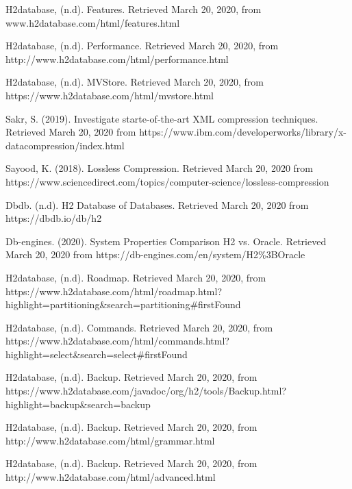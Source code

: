 \documentclass{acmart}
\begin{document}
\begin{thebibliography}{99}
	 H2database, (n.d). Features. Retrieved March 20, 2020, from www.h2database.com/html/features.html 
	
	 H2database, (n.d). Performance. Retrieved March 20, 2020, from http://www.h2database.com/html/performance.html
	
	 H2database, (n.d). MVStore. Retrieved March 20, 2020, from https://www.h2database.com/html/mvstore.html
	
	 Sakr, S. (2019). Investigate starte-of-the-art XML compression techniques. Retrieved March 20, 2020 from https://www.ibm.com/developerworks/library/x-datacompression/index.html
	
	 Sayood, K. (2018). Lossless Compression. Retrieved March 20, 2020 from https://www.sciencedirect.com/topics/computer-science/lossless-compression
	
	 Dbdb. (n.d). H2 Database of Databases. Retrieved March 20, 2020 from https://dbdb.io/db/h2

     Db-engines. (2020). System Properties Comparison H2 vs. Oracle. Retrieved March 20, 2020 from https://db-engines.com/en/system/H2\%3BOracle
    
     H2database, (n.d). Roadmap. Retrieved March 20, 2020, from https://www.h2database.com/html/roadmap.html?highlight=partitioning\&search=partitioning\#firstFound
    
     H2database, (n.d). Commands. Retrieved March 20, 2020, from https://www.h2database.com/html/commands.html?highlight=select\&search=select\#firstFound
    
     H2database, (n.d). Backup. Retrieved March 20, 2020, from https://www.h2database.com/javadoc/org/h2/tools/Backup.html?highlight=backup\&search=backup
    
     H2database, (n.d). Backup. Retrieved March 20, 2020, from http://www.h2database.com/html/grammar.html
    
     H2database, (n.d). Backup. Retrieved March 20, 2020, from http://www.h2database.com/html/advanced.html
    

\end{thebibliography}
\end{document}
